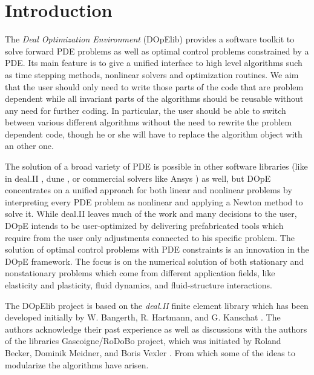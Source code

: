 \documentclass[prodmode,acmtoms]{acmsmall}
\numberwithin{equation}{section}
\begin{document}
\section{Introduction}
\label{introduction}
The \textit{Deal Optimization Environment} (DOpElib) 
provides a software toolkit to solve forward PDE
problems as well as optimal control problems constrained by a PDE. 
Its main feature is to give a unified interface to high level algorithms such as 
time stepping methods, nonlinear solvers and optimization routines. 
We aim that the user should only need to write those parts
of the code that are problem dependent while all invariant parts of the algorithms
should be reusable without any need for further coding.
In particular, the user should be able to switch between various different 
algorithms without the need to rewrite the problem dependent code, though he or she will
have to replace the algorithm object with an other one. 

The
solution of a broad variety of PDE is possible in other software
libraries (like in deal.II \cite{deal}, dune \cite{dune} , 
or commercial solvers like Ansys \cite{ansys}) 
as well, but
DOpE concentrates on a unified approach for both linear and nonlinear
problems by interpreting every PDE problem as nonlinear and applying a
Newton method to solve it. While deal.II leaves much of the work and many
decisions to the user, DOpE intends to be user-optimized by delivering
prefabricated tools which require from the user only adjustments connected
to his specific problem. The solution of optimal control problems with PDE
constraints is an innovation in the DOpE framework.
The focus is on the numerical solution of both stationary and nonstationary
problems which come from different application fields, like elasticity and
plasticity, fluid dynamics, and fluid-structure interactions.

The DOpElib project is 
based on the \textit{deal.II} \cite{deal} finite element library which has been developed
 initially by W. Bangerth, R. Hartmann, and G. Kanschat \cite{deal}.
The authors acknowledge their past experience as well as discussions with 
the authors of the libraries 
Gascoigne/RoDoBo project, which was initiated by 
Roland Becker, Dominik Meidner,  and Boris Vexler \cite{rodobo}. 
From which some of the ideas to modularize the algorithms have arisen.
\end{document}
